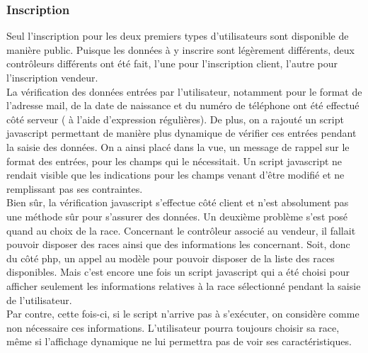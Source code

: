 \documentclass{article}
\begin{document}
\subsubsection{Inscription}
Seul l'inscription pour les deux premiers types d'utilisateurs sont disponible de manière public. Puisque les données à y inscrire sont légèrement différents, deux contrôleurs différents ont été fait, l'une pour l'inscription client, l'autre pour l'inscription vendeur. 
\\
La vérification des données entrées par l'utilisateur, notamment pour le format de l'adresse mail, de la date de naissance et du numéro de téléphone ont été effectué côté serveur ( à l'aide d'expression régulières).  
De plus, on a rajouté un script javascript permettant de manière plus dynamique de vérifier ces entrées pendant la saisie des données. On a ainsi placé dans la vue, un message de rappel sur le format des entrées, pour les champs qui le nécessitait. Un script javascript ne rendait visible que les indications pour les champs venant d'être modifié et ne remplissant pas ses contraintes. 
\\
Bien sûr, la vérification javascript s'effectue côté client et n'est absolument pas une méthode sûr pour s'assurer des données. 
Un deuxième problème s'est posé quand au choix de la race. Concernant le contrôleur associé au vendeur, il fallait pouvoir disposer des races ainsi que des informations les concernant. Soit, donc du côté php, un appel au modèle pour pouvoir disposer de la liste des races disponibles.
Mais c'est encore une fois un script javascript qui a été choisi pour afficher seulement les informations relatives à la race sélectionné pendant la saisie de l'utilisateur. 
\\
Par contre, cette fois-ci, si le script n'arrive pas à s'exécuter, on considère comme non nécessaire ces informations. L'utilisateur pourra toujours choisir sa race, même si l'affichage dynamique ne lui permettra pas de voir ses caractéristiques. 
\end{document}
